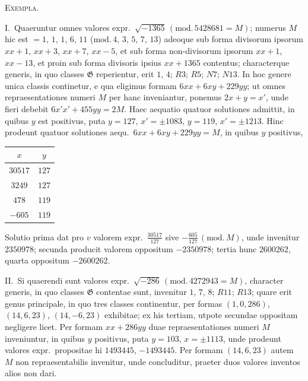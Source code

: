 \documentclass[12pt,a4paper]{article}
\theoremstyle{plain}
\theoremstyle{definition}
\theoremstyle{remark}
\begin{document}
\section{}

\textsc{Exempla.}

\textsc{I.}\ Quaeruntur omnes valores expr.~$\surd{-1365}\,(\mathrm{mod.}\,5428681=M)$; numerus $M$ hic est $=1$, $1$, $1$, $6$, $11$ ($\mathrm{mod.}\,4$, $3$, $5$, $7$, $13$) adeoque sub forma divisorum ipsorum $xx+1$, $xx+3$, $xx+7$, $xx-5$, et sub forma non-divisorum ipsorum $xx+1$, $xx-13$, et proin sub forma divisoris ipsius $xx+1365$ contentus; characterque generis, in quo classes $\mathfrak{G}$ reperientur, erit $1$, $4$; $R3$; $R5$; $N7$; $N13$. In hoc genere unica classis continetur, e qua eligimus formam $6xx+6xy+229yy$; ut omnes repraesentationes numeri $M$ per hanc inveniantur, ponemus $2x+y=x'$, unde fieri debebit $6x'x'+455yy=2M$. Haec aequatio quatuor solutiones admittit, in quibus $y$ est positivus, puta $y=127$, $x'=\pm 1083$, $y=119$, $x'=\pm 1213$. Hinc prodeunt quatuor solutiones aequ.\ $6xx+6xy+229yy=M$, in quibus $y$ positivus,
\begin{center}
\begin{tabular}{c|c}
$x$ & $y$\\
\hline
$30517$ & $127$\\
$3249$ & $127$\\
$478$ & $119$\\
$-605$ & $119$
\end{tabular}
\end{center}
Solutio prima dat pro $v$ valorem expr.~$\frac{30517}{127}$ sive $-\frac{605}{127}\,(\mathrm{mod.}\,M)$, unde invenitur $2350978$; secunda producit valorem oppositum $-2350978$; tertia hunc $2600262$, quarta oppositum $-2600262$.

\textsc{II.}\ Si quaerendi sunt valores expr.~$\surd{-286}\,(\mathrm{mod.}\,4272943=M)$, character generis, in quo classes $\mathfrak{G}$ contentae sunt, invenitur $1$, $7$, $8$; $R11$; $R13$; quare erit genus principale, in quo tres classes continentur, per formas $(1,0,286)$, $(14,6,23)$, $(14,-6,23)$ exhibitae; ex his tertiam, utpote secundae oppositam negligere licet. Per formam $xx+286yy$ duae repraesentationes numeri $M$ inveniuntur, in quibus $y$ positivus, puta $y=103$, $x=\pm 1113$, unde prodeunt valores expr.\ propositae hi $1493445$, $-1493445$. Per formam $(14,6,23)$ autem $M$ non repraesentabilis invenitur, unde concluditur, praeter duos valores inventos alios non dari.
\end{document}
